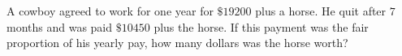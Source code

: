 A cowboy agreed to work for one year for $\$19200$ plus a horse. He quit after $7$ months and was paid $\$10450$ plus the horse. If this payment was the fair proportion of his yearly pay, how many dollars was the horse worth?
